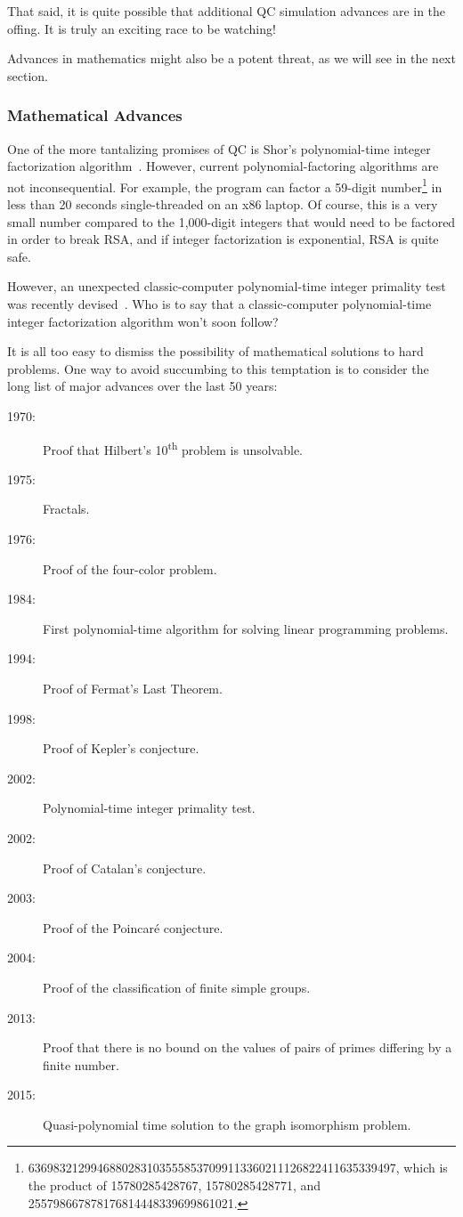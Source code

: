 That said, it is quite possible that additional QC simulation advances
are in the offing.
It is truly an exciting race to be watching!

Advances in mathematics might also be a potent threat, as we will see
in the next section.

\subsubsection{Mathematical Advances}
\label{sec:future:Mathematical Advances}

One of the more tantalizing promises of QC is Shor's
polynomial-time integer factorization
algorithm~\cite{Shor:1997:PAP:264393.264406,WikipediaShorsAlgorithm}.
However, current polynomial-factoring algorithms are not
inconsequential.
For example, the  program can factor a 59-digit number\footnote{
	\scriptsize
	63698321299468802831035558537099113360211126822411635339497,
	which is the product of 15780285428767, 15780285428771, and
	255798667878176814448339699861021.}
in less than 20 seconds single-threaded on an x86 laptop.
Of course, this is a very small number compared to the 1,000-digit
integers that would need to be factored in order to break RSA,
and if integer factorization is exponential, RSA is quite safe.

However, an unexpected classic-computer
polynomial-time integer primality test was recently
devised~\cite{ManindraAgrawal2004PrimesIsInP,WikipediaAKSPrimalityTest}.
Who is to say that a classic-computer polynomial-time integer
factorization algorithm won't soon follow?

It is all too easy to dismiss the possibility of mathematical solutions
to hard problems.
One way to avoid succumbing to this temptation is to consider the
long list of major advances over the last 50 years:

\begin{description}
\item[1970:] Proof that Hilbert's 10\textsuperscript{th} problem
	is unsolvable.
\item[1975:] Fractals.
\item[1976:] Proof of the four-color problem.
\item[1984:] First polynomial-time algorithm for solving linear
	programming problems.
\item[1994:] Proof of Fermat's Last Theorem.
\item[1998:] Proof of Kepler's conjecture.
\item[2002:] Polynomial-time integer primality test.
\item[2002:] Proof of Catalan's conjecture.
\item[2003:] Proof of the Poincar\'e conjecture.
\item[2004:] Proof of the classification of finite simple groups.
\item[2013:] Proof that there is no bound on the values of
	pairs of primes differing by a finite number.
\item[2015:] Quasi-polynomial time solution to the graph isomorphism
	problem.
\end{description}

